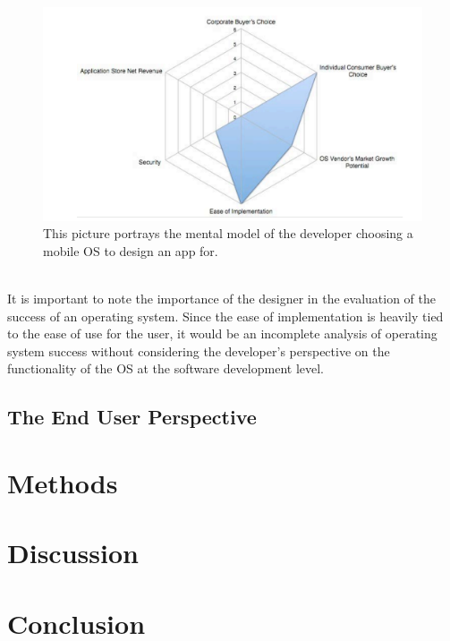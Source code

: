 \documentclass[11pt]{article}
\begin{document}
\cite{Palme}
\begin{figure}[h]
\begin{center}
\includegraphics[width=5in]{developerPerspective}
\caption{This picture portrays the mental model of the developer choosing a mobile OS to design an app for. \cite{PatentWars}}
\label{developerPerspective}
\end{center}
\end{figure}\\

\indent It is important to note the importance of the designer in the evaluation of the success of an operating system. Since the ease of implementation is heavily tied to the ease of use for the user, it would be an incomplete analysis of operating system success without considering the developer's perspective on the functionality of the OS at the software development level.

\subsection{The End User Perspective}
\section{Methods}
\section{Discussion}
\section{Conclusion}



\end{document}
